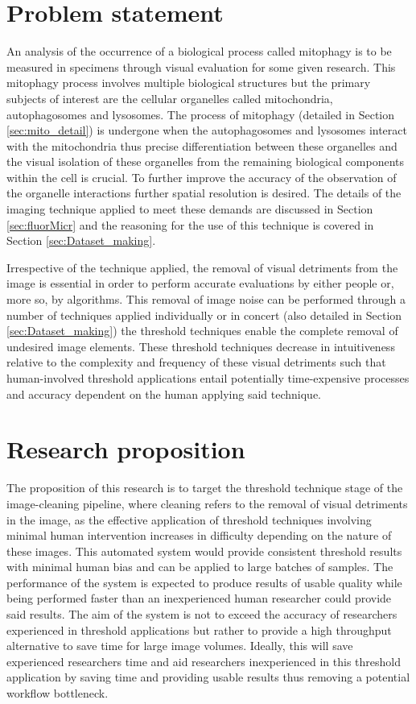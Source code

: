 \section{Problem statement}\label{sec:prob_state}
An analysis of the occurrence of a biological process called mitophagy is to be measured in specimens through visual evaluation for some given research. This mitophagy process involves multiple biological structures but the primary subjects of interest are the cellular organelles called mitochondria, autophagosomes and lysosomes. The process of mitophagy (detailed in Section \ref{sec:mito_detail}) is undergone when the autophagosomes and lysosomes interact with the mitochondria thus precise differentiation between these organelles and the visual isolation of these organelles from the remaining biological components within the cell is crucial. To further improve the accuracy of the observation of the organelle interactions further spatial resolution is desired. The details of the imaging technique applied to meet these demands are discussed in Section \ref{sec:fluorMicr} and the reasoning for the use of this technique is covered in Section \ref{sec:Dataset_making}.\par Irrespective of the technique applied, the removal of visual detriments from the image is essential in order to perform accurate evaluations by either people or, more so, by algorithms. This removal of image noise can be performed through a number of techniques applied individually or in concert (also detailed in Section \ref{sec:Dataset_making}) the threshold techniques enable the complete removal of undesired image elements. These threshold techniques decrease in intuitiveness relative to the complexity and frequency of these visual detriments such that human-involved threshold applications entail potentially time-expensive processes and accuracy dependent on the human applying said technique.

\section{Research proposition}
The proposition of this research is to target the threshold technique stage of the image-cleaning pipeline, where cleaning refers to the removal of visual detriments in the image, as the effective application of threshold techniques involving minimal human intervention increases in difficulty depending on the nature of these images. This automated system would provide consistent threshold results with minimal human bias and can be applied to large batches of samples. The performance of the system is expected to produce results of usable quality while being performed faster than an inexperienced human researcher could provide said results. The aim of the system is not to exceed the accuracy of researchers experienced in threshold applications but rather to provide a high throughput alternative to save time for large image volumes. Ideally, this will save experienced researchers time and aid researchers inexperienced in this threshold application by saving time and providing usable results thus removing a potential workflow bottleneck.

